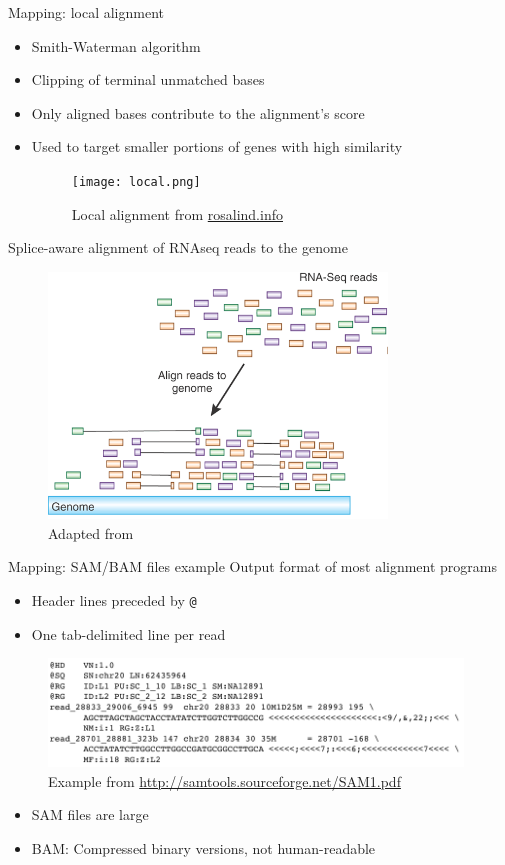 \documentclass[presentation]{beamer}
\begin{document}
\begin{frame}[label=sec-3-1-6]{Mapping: local alignment}
\begin{itemize}
\item Smith-Waterman algorithm
\item Clipping of terminal unmatched bases
\item Only aligned bases contribute to the alignment's score
\item Used to target smaller portions of genes with high similarity
\begin{figure}[htb]
\centering
\texttt{[image: local.png]}
\caption{Local alignment from \href{http://rosalind.info/glossary/local-alignment/}{rosalind.info}}
\end{figure}
\end{itemize}
\end{frame}

\begin{frame}[label=sec-3-1-7]{Splice-aware alignment of RNAseq reads to the genome}
\begin{figure}[htb]
\centering
\includegraphics[width=9cm]{Haas-2010-NatureBiotechnology.png}
\caption{Adapted from \citet{Haas2010}}
\end{figure}
\end{frame}
\begin{frame}[fragile,label=sec-3-1-8]{Mapping: SAM/BAM files example}
 Output format of most alignment programs 

\begin{itemize}
\item Header lines preceded by \texttt{@}
\item One tab-delimited line per read
\end{itemize}
\begin{figure}[htb]
\centering
\includegraphics[width=11cm]{SAMfile.png}
\caption{Example from  \url{http://samtools.sourceforge.net/SAM1.pdf}}
\end{figure}

\begin{itemize}
\item SAM files are large
\item BAM: Compressed binary versions, not human-readable
\end{itemize}
\end{frame}
\end{document}
